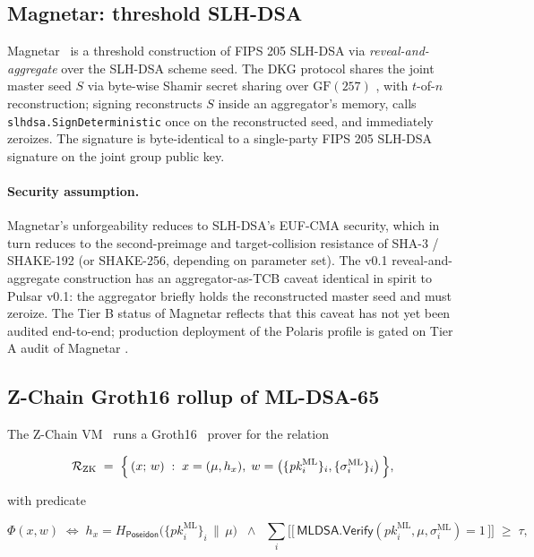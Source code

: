 \subsection{Magnetar: threshold SLH-DSA}

Magnetar~\cite{magnetar} is a threshold construction of FIPS 205
\cite{fips205} SLH-DSA via \emph{reveal-and-aggregate} over the
SLH-DSA scheme seed. The DKG protocol shares the joint master seed
$S$ via byte-wise Shamir secret sharing over $\mathrm{GF}(257)$
\cite{shamir1979}, with $t$-of-$n$ reconstruction; signing
reconstructs $S$ inside an aggregator's memory, calls
\texttt{slhdsa.SignDeterministic} once on the reconstructed seed, and
immediately zeroizes. The signature is byte-identical to a single-party
FIPS 205 SLH-DSA signature on the joint group public key.

\paragraph{Security assumption.}
Magnetar's unforgeability reduces to SLH-DSA's EUF-CMA security,
which in turn reduces to the second-preimage and target-collision
resistance of SHA-3 / SHAKE-192 (or SHAKE-256, depending on
parameter set). The v0.1 reveal-and-aggregate construction has an
aggregator-as-TCB caveat identical in spirit to Pulsar v0.1: the
aggregator briefly holds the reconstructed master seed and must
zeroize. The Tier B status of Magnetar reflects that this caveat
has not yet been audited end-to-end; production deployment of the
Polaris profile is gated on Tier A audit of Magnetar
\cite{magnetar}.

\subsection{Z-Chain Groth16 rollup of ML-DSA-65}

The Z-Chain VM~\cite{chainsrepo} runs a Groth16~\cite{groth2016}
prover for the relation

\begin{equation}
\mathcal{R}_{\mathrm{ZK}} \;=\; \Bigl\{\, (x;\, w)
\;:\; x = (\mu, h_x),\;
w = \bigl(\{\mathit{pk}_i^{\mathrm{ML}}\}_i,
\{\sigma_i^{\mathrm{ML}}\}_i\bigr)\,\Bigr\},
\end{equation}

with predicate

\begin{equation*}
\Phi(x, w) \;\iff\;
h_x = H_{\mathsf{Poseidon}}\!\bigl(\{\mathit{pk}_i^{\mathrm{ML}}\}_i\,\|\,\mu\bigr)
\;\;\wedge\;\;
\sum_i \bigl[\!\bigl[\,\mathsf{MLDSA.Verify}(\mathit{pk}_i^{\mathrm{ML}}, \mu, \sigma_i^{\mathrm{ML}}) = 1\,\bigr]\!\bigr]
\;\geq\; \tau,
\end{equation*}

